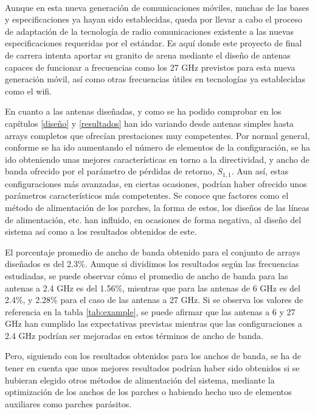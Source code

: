 \\
\par Aunque en esta nueva generación de comunicaciones móviles, muchas de las bases y especificaciones ya hayan sido establecidas, queda por llevar a cabo el proceso de adaptación de la tecnología de radio comunicaciones existente a las nuevas especificaciones requeridas por el estándar. Es aquí donde este proyecto de final de carrera intenta aportar su granito de arena mediante el diseño de antenas capaces de funcionar a frecuencias como los 27 GHz previstos para esta nueva generación móvil, así como otras frecuencias útiles en tecnologías ya establecidas como el \gls{wifi}.
\\
\par En cuanto a las antenas diseñadas, y como se ha podido comprobar en los capítulos \ref{diseño} y \ref{resultados} han ido variando desde antenas simples hasta arrays completos que ofrecían prestaciones muy competentes. Por normal general, conforme se ha ido aumentando el número de elementos de la configuración, se ha ido obteniendo unas mejores características en torno a la directividad, y ancho de banda ofrecido por el parámetro de pérdidas de retorno, $S_{1,1}$. Aun así, estas configuraciones más avanzadas, en ciertas ocasiones, podrían haber ofrecido unos parámetros característicos más competentes. Se conoce que factores como el método de alimentación de los parches, la forma de estos, los diseños de las líneas de alimentación, etc. han influido, en ocasiones de forma negativa, al diseño del sistema así como a los resultados obtenidos de este.
\\
\par El porcentaje promedio de ancho de banda obtenido para el conjunto de arrays diseñados es del 2.3\%. Aunque si dividimos los resultados según las frecuencias estudiadas, se puede observar cómo el promedio de ancho de banda para las antenas a 2.4 GHz es del 1.56\%, mientras que para las antenas de 6 GHz es del 2.4\%, y 2.28\% para el caso de las antenas a 27 GHz. Si se observa los valores de referencia en la tabla \ref{tab:example}, se puede afirmar que las antenas a 6 y 27 GHz han cumplido las expectativas previstas mientras que las configuraciones a 2.4 GHz podrían ser mejoradas en estos términos de ancho de banda. 
\\
\par Pero, siguiendo con los resultados obtenidos para los anchos de banda, se ha de tener en cuenta que unos mejores resultados podrían haber sido obtenidos si se hubieran elegido otros métodos de alimentación del sistema, mediante la optimización de los anchos de los parches o habiendo hecho uso de elementos auxiliares como parches parásitos. 
